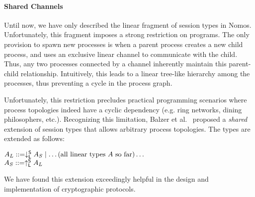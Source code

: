 
\paragraph*{\textbf{Shared Channels}}
Until now, we have only described the linear fragment of session types
in Nomos.
Unfortunately, this fragment imposes a strong restriction on programs.
The only provision to spawn new processes is when a parent process creates a new
child process, and uses an exclusive linear channel to communicate with the child.
Thus, any two processes connected by a channel inherently maintain this parent-child
relationship.
Intuitively, this leads to a linear tree-like hierarchy among the processes,
thus preventing a cycle in the process graph.

Unfortunately, this restriction precludes practical programming scenarios
where process topologies indeed have a cyclic dependency (e.g. ring networks,
dining philosophers, etc.).
Recognizing this limitation, Balzer et al.~\cite{balzer2017manifest} proposed
a \emph{shared} extension of session types that allows arbitrary process topologies.
The types are extended as follows:
\begin{center}
\begin{minipage}{0cm}
\begin{tabbing}
$A_L ::= \downarrow^{\mathsf{S}}_{\mathsf{L}} A_S \mid \ldots \text{(all linear types $A$ so far)}\ldots$\\
$A_S ::= \uparrow^{\mathsf{S}}_{\mathsf{L}} A_L$
\end{tabbing}
\end{minipage}
\end{center}
We have found this extension exceedingly helpful in the design and implementation
of cryptographic protocols.

